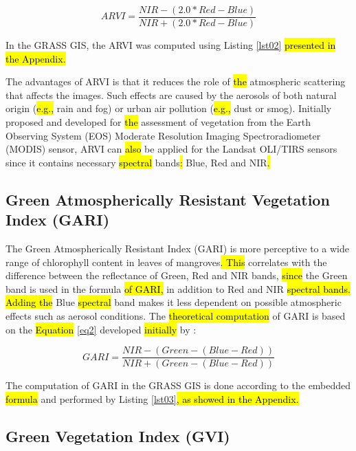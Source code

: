 \documentclass[jmse,article,submit,pdftex,moreauthors]{Definitions/mdpi}
\begin{document}
\begin{equation}\label{eq1}
	ARVI = \frac{NIR - (2.0*Red - Blue)}{NIR + (2.0*Red - Blue)}
\end{equation}

In the GRASS GIS, the ARVI was computed using\hl{ }Listing \ref{lst02}\hl{ presented in the Appendix.} 

The advantages of ARVI is that it reduces the role of \hl{the }atmospheric scattering that affects the images. Such effects are caused by the aerosols of both natural origin (\hl{e.g., }rain and fog) or urban air pollution (\hl{e.g., }dust or smog). Initially proposed and developed for \hl{the }assessment of vegetation from the Earth Observing System (EOS) Moderate Resolution Imaging Spectroradiometer (MODIS) sensor, ARVI can \hl{also }be applied for the Landsat OLI/TIRS sensors since it contains necessary \hl{spectral }bands\hl{: }Blue, Red and NIR\hl{.}
\subsection{Green Atmospherically Resistant Vegetation Index (GARI)}

The Green Atmospherically Resistant Index (GARI) is more perceptive to a wide range of chlorophyll content in leaves of mangroves\hl{. This }correlates with the difference between the reflectance of Green, Red and NIR bands, \hl{since} the Green band is used in the formula \hl{of GARI, }in addition to Red and NIR \hl{spectral bands. Adding the} Blue \hl{spectral }band makes it less dependent on possible atmospheric effects such as aerosol conditions. The \hl{theoretical computation} of GARI is based on the \hl{Equation} \ref{eq2} developed \hl{initially }by \cite{GITELSON1996289}:

\begin{equation}\label{eq2}
	GARI = \frac{NIR - (Green - (Blue - Red))}{NIR + (Green - (Blue - Red))}
\end{equation} 

The computation of GARI in the GRASS GIS is done according to the embedded \hl{formula} and\hl{ }performed by Listing \ref{lst03}\hl{, as showed in the Appendix.} 

\subsection{Green Vegetation Index (GVI)}
\end{document}
